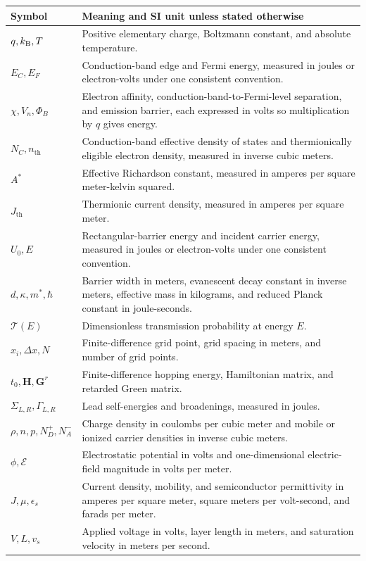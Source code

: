 \begin{center}
\small
\begin{tabularx}{\textwidth}{@{}lX@{}}
\toprule
Symbol & Meaning and SI unit unless stated otherwise \\
\midrule
$q,k_{\mathrm B},T$ & Positive elementary charge, Boltzmann constant, and absolute temperature. \\
$E_C,E_F$ & Conduction-band edge and Fermi energy, measured in joules or electron-volts under one consistent convention. \\
$\chi,V_n,\Phi_B$ & Electron affinity, conduction-band-to-Fermi-level separation, and emission barrier, each expressed in volts so multiplication by $q$ gives energy. \\
$N_C,n_{\mathrm{th}}$ & Conduction-band effective density of states and thermionically eligible electron density, measured in inverse cubic meters. \\
$A^*$ & Effective Richardson constant, measured in amperes per square meter-kelvin squared. \\
$J_{\mathrm{th}}$ & Thermionic current density, measured in amperes per square meter. \\
$U_0,E$ & Rectangular-barrier energy and incident carrier energy, measured in joules or electron-volts under one consistent convention. \\
$d,\kappa,m^*,\hbar$ & Barrier width in meters, evanescent decay constant in inverse meters, effective mass in kilograms, and reduced Planck constant in joule-seconds. \\
$\mathcal T(E)$ & Dimensionless transmission probability at energy $E$. \\
$x_i,\Delta x,N$ & Finite-difference grid point, grid spacing in meters, and number of grid points. \\
$t_0,\bm H,\bm G^r$ & Finite-difference hopping energy, Hamiltonian matrix, and retarded Green matrix. \\
$\Sigma_{L,R},\Gamma_{L,R}$ & Lead self-energies and broadenings, measured in joules. \\
$\rho,n,p,N_D^+,N_A^-$ & Charge density in coulombs per cubic meter and mobile or ionized carrier densities in inverse cubic meters. \\
$\phi,\mathcal E$ & Electrostatic potential in volts and one-dimensional electric-field magnitude in volts per meter. \\
$J,\mu,\epsilon_s$ & Current density, mobility, and semiconductor permittivity in amperes per square meter, square meters per volt-second, and farads per meter. \\
$V,L,v_s$ & Applied voltage in volts, layer length in meters, and saturation velocity in meters per second. \\
\bottomrule
\end{tabularx}
\end{center}

